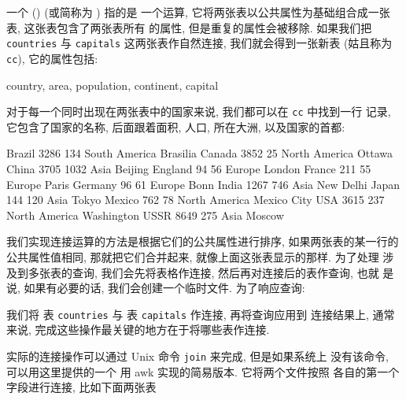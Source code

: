 一个  () (或简称为 ) 指的是 
一个运算, 它将两张表以公共属性为基础组合成一张表, 这张表包含了两张表所有
的属性, 但是重复的属性会被移除. 如果我们把 \verb'countries' 与
\verb'capitals' 这两张表作自然连接, 我们就会得到一张新表 (姑且称为
\verb'cc'), 它的属性包括:
\begin{awkcode}
    country, area, population, continent, capital
\end{awkcode}
对于每一个同时出现在两张表中的国家来说, 我们都可以在 \verb'cc' 中找到一行
记录, 它包含了国家的名称, 后面跟着面积, 人口, 所在大洲,
以及国家的首都:
\begin{awkcode}
    Brazil  3286    134     South America	Brasilia
    Canada  3852    25      North America	Ottawa
    China   3705    1032    Asia                Beijing
    England 94      56      Europe              London
    France  211     55      Europe              Paris
    Germany 96      61      Europe              Bonn
    India   1267    746     Asia                New Delhi
    Japan   144     120     Asia                Tokyo
    Mexico  762     78      North America	Mexico City
    USA     3615    237     North America	Washington
    USSR    8649    275     Asia                Moscow
\end{awkcode}

我们实现连接运算的方法是根据它们的公共属性进行排序, 如果两张表的某一行的
公共属性值相同, 那就把它们合并起来, 就像上面这张表显示的那样. 为了处理
涉及到多张表的查询, 我们会先将表格作连接, 然后再对连接后的表作查询, 也就 
是说, 如果有必要的话, 我们会创建一个临时文件.
为了响应查询:
我们将 表 \verb'countries' 与 表 \verb'capitals'  作连接, 再将查询应用到
连接结果上, 通常来说, 完成这些操作最关键的地方在于将哪些表作连接.

实际的连接操作可以通过 Unix 命令 \texttt{join} 来完成, 但是如果系统上
没有该命令, 可以用这里提供的一个 用 awk 实现的简易版本. 它将两个文件按照
各自的第一个字段进行连接, 比如下面两张表

